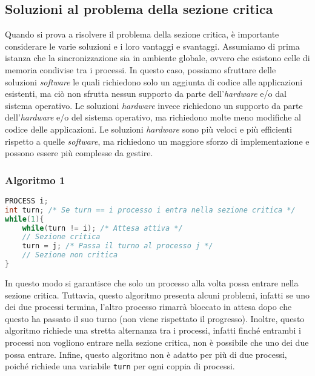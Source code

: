     \subsection{Soluzioni al problema della sezione critica}
        Quando si prova a risolvere il problema della sezione critica, è importante considerare le varie soluzioni e i loro vantaggi e svantaggi. Assumiamo di prima istanza che la sincronizzazione sia in ambiente globale, ovvero che esistono celle di memoria condivise tra i processi. In questo caso, possiamo sfruttare delle soluzioni \textit{software} le quali richiedono solo un aggiunta di codice alle applicazioni esistenti, ma ciò non sfrutta nessun supporto da parte dell'\textit{hardware} e/o dal sistema operativo. Le soluzioni \textit{hardware} invece richiedono un supporto da parte dell'\textit{hardware} e/o del sistema operativo, ma richiedono molte meno modifiche al codice delle applicazioni. Le soluzioni \textit{hardware} sono più veloci e più efficienti rispetto a quelle \textit{software}, ma richiedono un maggiore sforzo di implementazione e possono essere più complesse da gestire.


        \subsubsection{Algoritmo 1}
            \begin{lstlisting}[language=C++,basicstyle=\footnotesize]
PROCESS i;
int turn; /* Se turn == i processo i entra nella sezione critica */
while(1){
    while(turn != i); /* Attesa attiva */
    // Sezione critica
    turn = j; /* Passa il turno al processo j */
    // Sezione non critica
}
            \end{lstlisting}
            In questo modo si garantisce che solo un processo alla volta possa entrare nella sezione critica. Tuttavia, questo algoritmo presenta alcuni problemi, infatti se uno dei due processi termina, l'altro processo rimarrà bloccato in attesa dopo che questo ha passato il suo turno (non viene rispettato il progresso). Inoltre, questo algoritmo richiede una stretta alternanza tra i processi, infatti finché entrambi i processi non vogliono entrare nella sezione critica, non è possibile che uno dei due possa entrare. Infine, questo algoritmo non è adatto per più di due processi, poiché richiede una variabile \texttt{turn} per ogni coppia di processi.
